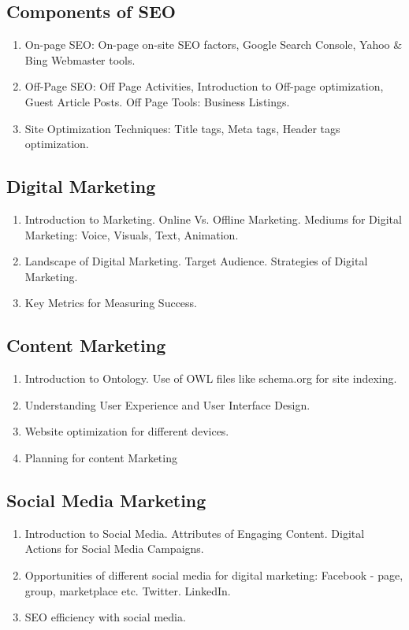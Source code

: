 \subsection{Components of SEO}
\begin{enumerate}
    \item On-page SEO: On-page on-site SEO factors, Google Search Console, Yahoo \& Bing Webmaster tools. 
    \item Off-Page SEO: Off Page Activities, Introduction to Off-page optimization, Guest Article Posts. Off Page Tools: Business Listings.
    \item Site Optimization Techniques: Title tags, Meta tags, Header tags optimization.
    
\end{enumerate}


\subsection{Digital Marketing}
\begin{enumerate}
    \item Introduction to Marketing. Online Vs. Offline Marketing. Mediums for Digital Marketing: Voice, Visuals, Text, Animation.
    \item Landscape of Digital Marketing. Target Audience. Strategies of Digital Marketing.
    \item Key Metrics for Measuring Success.
\end{enumerate}

\subsection{Content Marketing}

\begin{enumerate}
    \item Introduction to Ontology. Use of OWL files like schema.org for site indexing.
    \item Understanding User Experience and User Interface Design.
    \item Website optimization for different devices.
    \item Planning for content Marketing
\end{enumerate}

\subsection{Social Media Marketing}
\begin{enumerate}
    \item Introduction to Social Media. Attributes of Engaging Content. Digital Actions for Social Media Campaigns.
    \item Opportunities of different social media for digital marketing: Facebook - page, group, marketplace etc. Twitter. LinkedIn.
    \item SEO efficiency with social media.
\end{enumerate}

